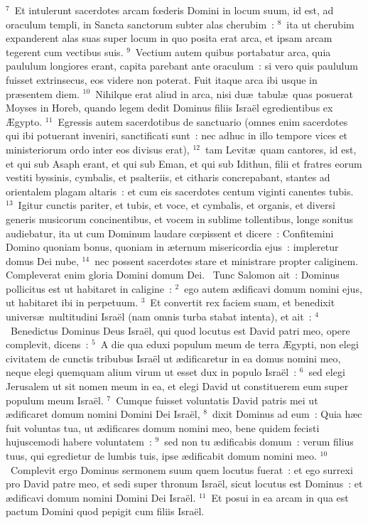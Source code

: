 ${}^{7}$~Et intulerunt sacerdotes arcam fœderis Domini in locum suum, id est, ad oraculum templi, in Sancta sanctorum subter alas cherubim~:
${}^{8}$~ita ut cherubim expanderent alas suas super locum in quo posita erat arca, et ipsam arcam tegerent cum vectibus suis.
${}^{9}$~Vectium autem quibus portabatur arca, quia paululum longiores erant, capita parebant ante oraculum~: si vero quis paululum fuisset extrinsecus, eos videre non poterat. Fuit itaque arca ibi usque in pr\ae sentem diem.
${}^{10}$~Nihilque erat aliud in arca, nisi du\ae\ tabul\ae\ quas posuerat Moyses in Horeb, quando legem dedit Dominus filiis Isra\"el egredientibus ex \AE gypto.
${}^{11}$~Egressis autem sacerdotibus de sanctuario (omnes enim sacerdotes qui ibi potuerant inveniri, sanctificati sunt~: nec adhuc in illo tempore vices et ministeriorum ordo inter eos divisus erat),
${}^{12}$~tam Levit\ae\ quam cantores, id est, et qui sub Asaph erant, et qui sub Eman, et qui sub Idithun, filii et fratres eorum vestiti byssinis, cymbalis, et psalteriis, et citharis concrepabant, stantes ad orientalem plagam altaris~: et cum eis sacerdotes centum viginti canentes tubis.
${}^{13}$~Igitur cunctis pariter, et tubis, et voce, et cymbalis, et organis, et diversi generis musicorum concinentibus, et vocem in sublime tollentibus, longe sonitus audiebatur, ita ut cum Dominum laudare cœpissent et dicere~: Confitemini Domino quoniam bonus, quoniam in \ae ternum misericordia ejus~: impleretur domus Dei nube,
${}^{14}$~nec possent sacerdotes stare et ministrare propter caliginem. Compleverat enim gloria Domini domum Dei.
~Tunc Salomon ait~: Dominus pollicitus est ut habitaret in caligine~:
${}^{2}$~ego autem \ae dificavi domum nomini ejus, ut habitaret ibi in perpetuum.
${}^{3}$~Et convertit rex faciem suam, et benedixit univers\ae\ multitudini Isra\"el (nam omnis turba stabat intenta), et ait~:
${}^{4}$~Benedictus Dominus Deus Isra\"el, qui quod locutus est David patri meo, opere complevit, dicens~:
${}^{5}$~A die qua eduxi populum meum de terra \AE gypti, non elegi civitatem de cunctis tribubus Isra\"el ut \ae dificaretur in ea domus nomini meo, neque elegi quemquam alium virum ut esset dux in populo Isra\"el~:
${}^{6}$~sed elegi Jerusalem ut sit nomen meum in ea, et elegi David ut constituerem eum super populum meum Isra\"el.
${}^{7}$~Cumque fuisset voluntatis David patris mei ut \ae dificaret domum nomini Domini Dei Isra\"el,
${}^{8}$~dixit Dominus ad eum~: Quia h\ae c fuit voluntas tua, ut \ae dificares domum nomini meo, bene quidem fecisti hujuscemodi habere voluntatem~:
${}^{9}$~sed non tu \ae dificabis domum~: verum filius tuus, qui egredietur de lumbis tuis, ipse \ae dificabit domum nomini meo.
${}^{10}$~Complevit ergo Dominus sermonem suum quem locutus fuerat~: et ego surrexi pro David patre meo, et sedi super thronum Isra\"el, sicut locutus est Dominus~: et \ae dificavi domum nomini Domini Dei Isra\"el.
${}^{11}$~Et posui in ea arcam in qua est pactum Domini quod pepigit cum filiis Isra\"el.



